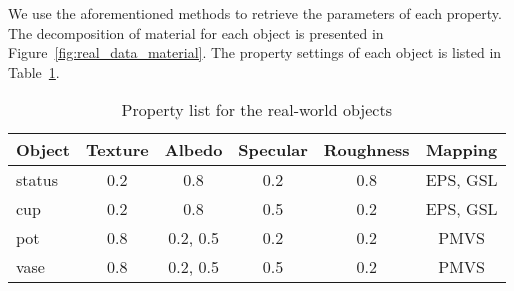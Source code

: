 We use the aforementioned methods to retrieve the parameters of each property. The decomposition of material for each object is presented in Figure~\ref{fig:real_data_material}. The property settings of each object is listed in Table~\ref{tab:real_data_prop_list}.
\begin{table}[!htbp]
  \centering
  \begin{tabular}{l*{5}{c}}
  \hline
  \textbf{Object} & Texture & Albedo & Specular & Roughness & Mapping\\
  \hline
  status & 0.2 & 0.8 & 0.2 & 0.8 & EPS, GSL\\
  cup & 0.2 & 0.8 & 0.5 & 0.2 & EPS, GSL\\
  pot & 0.8 & 0.2, 0.5 & 0.2 & 0.2 & PMVS\\
  vase & 0.8 & 0.2, 0.5 & 0.5 & 0.2 & PMVS\\
  \hline
  \end{tabular}
  \caption{Property list for the real-world objects}
  \label{tab:real_data_prop_list}
\end{table}



